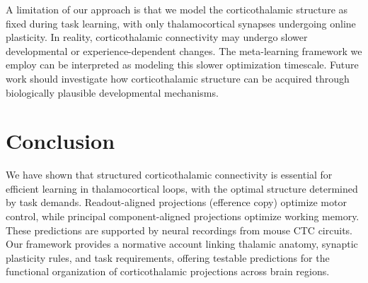 \documentclass[11pt]{article}
\begin{document}
A limitation of our approach is that we model the corticothalamic structure as fixed during task learning, with only thalamocortical synapses undergoing online plasticity. In reality, corticothalamic connectivity may undergo slower developmental or experience-dependent changes. The meta-learning framework we employ can be interpreted as modeling this slower optimization timescale. Future work should investigate how corticothalamic structure can be acquired through biologically plausible developmental mechanisms.

\section{Conclusion}

We have shown that structured corticothalamic connectivity is essential for efficient learning in thalamocortical loops, with the optimal structure determined by task demands. Readout-aligned projections (efference copy) optimize motor control, while principal component-aligned projections optimize working memory. These predictions are supported by neural recordings from mouse CTC circuits. Our framework provides a normative account linking thalamic anatomy, synaptic plasticity rules, and task requirements, offering testable predictions for the functional organization of corticothalamic projections across brain regions.



\end{document}
